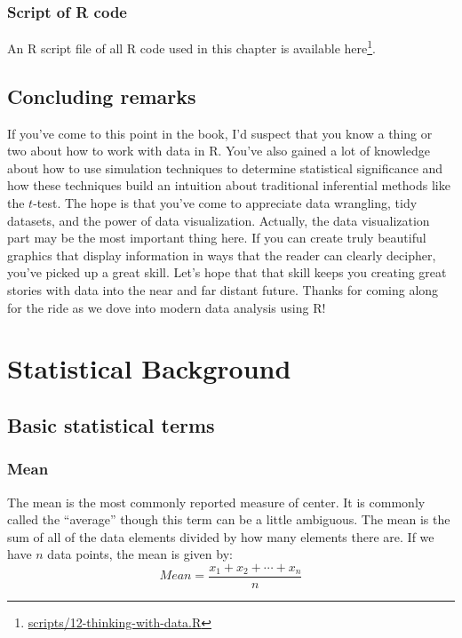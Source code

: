 \documentclass[12pt,]{krantz}
\renewcommand{\href}[2]{#2\footnote{\url{#1}}}
\theoremstyle{definition}
\theoremstyle{definition}
\theoremstyle{definition}
\theoremstyle{remark}
\begin{document}
\subsection{Script of R code}\label{script-of-r-code-9}

An R script file of all R code used in this chapter is available
\href{scripts/12-thinking-with-data.R}{here}.

\section*{Concluding remarks}\label{concluding-remarks}


If you've come to this point in the book, I'd suspect that you know a
thing or two about how to work with data in R. You've also gained a lot
of knowledge about how to use simulation techniques to determine
statistical significance and how these techniques build an intuition
about traditional inferential methods like the \(t\)-test. The hope is
that you've come to appreciate data wrangling, tidy datasets, and the
power of data visualization. Actually, the data visualization part may
be the most important thing here. If you can create truly beautiful
graphics that display information in ways that the reader can clearly
decipher, you've picked up a great skill. Let's hope that that skill
keeps you creating great stories with data into the near and far distant
future. Thanks for coming along for the ride as we dove into modern data
analysis using R!

\cleardoublepage

\appendix {}


\chapter{Statistical Background}\label{appendixA}

\section{Basic statistical terms}\label{basic-statistical-terms}

\subsection{Mean}\label{mean}

The mean is the most commonly reported measure of center. It is commonly
called the ``average'' though this term can be a little ambiguous. The
mean is the sum of all of the data elements divided by how many elements
there are. If we have \(n\) data points, the mean is given by:
\[Mean = \frac{x_1 + x_2 + \cdots + x_n}{n}\]
\end{document}
